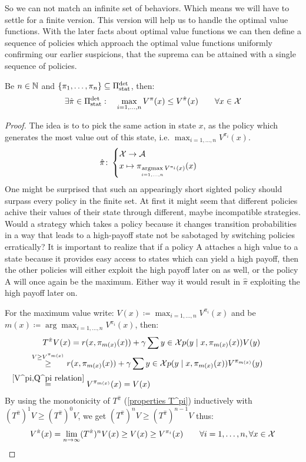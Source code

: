 So we can not match an infinite set of behaviors. Which means we will have to settle for a finite version. This version will help us to handle the optimal value functions. With the later facts about optimal value functions we can then define a sequence of policies which approach the optimal value functions uniformly confirming our earlier suspicions, that the suprema can be attained with a single sequence of policies. 

\begin{prop}
	Be \(n\in\mathbb{N}\) and \(\{\pi_1,\dots,\pi_n\}\subseteq \Pi_{\textnormal{stat}}^{\textnormal{det}} \), then:
	\[\exists \hat{\pi}\in\Pi_{\textnormal{stat}}^{\textnormal{det}}: \quad \max_{i=1,\dots,n} V^\pi(x)\le V^{\hat{\pi}}(x) \qquad \forall x\in\mathcal{X} \]
\end{prop}
\begin{proof}
	The idea is to to pick the same action in state \(x\), as the policy which generates the most value out of this state, i.e. \(\max_{i=1,\dots,n}V^{\pi_i}(x)\). 
	\[
		\hat{\pi}\colon
	\begin{cases} 
		\mathcal{X}\to\mathcal{A}\\
		x\mapsto \pi_{\mathop{\text{argmax}}\limits_{i=1,\dots,n}V^{\pi_i}(x)}(x)
	\end{cases}
	\]
	One might be surprised that such an appearingly short sighted policy should surpass every policy in the finite set. At first it might seem that different policies achive their values of their state through different, maybe incompatible strategies. Would a strategy which takes a policy because it changes transition probabilities in a way that leads to a high-payoff state not be sabotaged by switching policies erratically?
	It is important to realize that if a policy A attaches a high value to a state because it provides easy access to states which can yield a high payoff, then the other policies will either exploit the high payoff later on as well, or the policy A will once again be the maximum. Either way it would result in \(\hat{\pi}\) exploiting the high payoff later on. 

	For the maximum value write: \(V(x)\coloneqq \max_{i=1,\dots, n}V^{\pi_i}(x)\) and be \(m(x) \coloneqq \arg\max_{i=1,\dots,n}V^{\pi_i}(x)\), then:
	\begin{align*}
		&T^{\hat{\pi}}V(x)=r(x,\pi_{m(x)}(x))
		+\gamma \sum{y\in\cX} p(y\mid x,\pi_{m(x)}(x))V(y)\\
		&\lxgq{V\ge V^{\pi_{m(x)}}} r(x,\pi_{m(x)}(x))
		+\gamma \sum{y\in\cX} p(y\mid x,\pi_{m(x)}(x))V^{\pi_{m(x)}}(y)\\
		&\lxeq{\ref{V^pi,Q^pi relation}} V^{\pi_{m(x)}}(x)=V(x)
	\end{align*}
	By using the monotonicity of \(T^{\hat{\pi}} \) (\ref{properties T^pi}) inductively with \((T^{\hat{\pi}})^1 V \ge (T^{\hat{\pi}})^0 V \), we get
	\( (T^{\hat{\pi}})^n V \ge (T^{\hat{\pi}})^{n-1} V \) thus:
	\[
		V^{\hat{\pi}}(x) = \lim_{n\to\infty} (T^{\hat{\pi}})^n V(x) 
		\ge V(x) \ge V^{\pi_i}(x)
		\qquad \forall i=1,\dots,n, \forall x\in\mathcal{X}
		\qedhere
	\] 
\end{proof}

